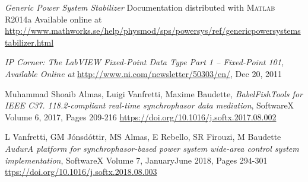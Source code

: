 \documentclass[journal]{IEEEtran}
\begin{document}
\begin{thebibliography}{1}
 \emph{Generic Power System Stabilizer} Documentation distributed with \textsc{Matlab} R2014a Available online at \url{http://www.mathworks.se/help/physmod/sps/powersys/ref/genericpowersystemstabilizer.html}

 \emph{IP Corner: The LabVIEW Fixed-Point Data Type Part 1 – Fixed-Point 101, Available Online at} \url{http://www.ni.com/newsletter/50303/en/}, Dec 20, 2011 



 Muhammad Shoaib Almas, Luigi Vanfretti, Maxime Baudette, \emph{BabelFish\textendash Tools for IEEE C37. 118.2-compliant real-time synchrophasor data mediation}, SoftwareX Volume 6, 2017, Pages 209-216 \url{https://doi.org/10.1016/j.softx.2017.08.002}

 L Vanfretti, GM J\'{o}nsd\'{o}ttir, MS Almas, E Rebello, SR Firouzi, M Baudette \emph{Audur\textendash A platform for synchrophasor-based power system wide-area control system implementation}, SoftwareX Volume 7, January\textendash June 2018, Pages 294-301 \url{ttps://doi.org/10.1016/j.softx.2018.08.003}




\end{thebibliography}

% 

\end{document}
